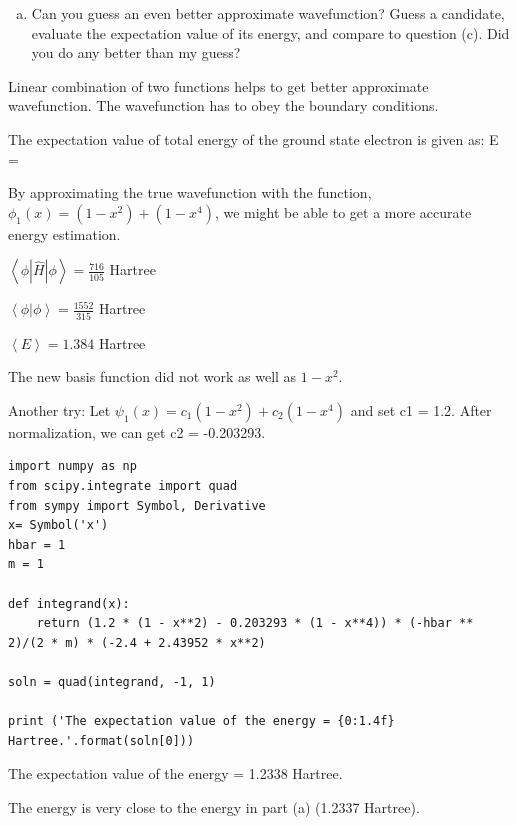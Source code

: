 \documentclass[11pt]{article}
\begin{document}
\begin{enumerate}[(d)]
\item Can you guess an even better approximate wavefunction? Guess a candidate, evaluate the expectation value of its energy, and compare to question (c). Did you do any better than my guess?
\end{enumerate}

Linear combination of two functions helps to get better approximate wavefunction. The wavefunction has to obey the boundary conditions.

\begin{center}

The expectation value of total energy of the ground state electron is given as:
\left \langle E \right \rangle = 

By approximating the true wavefunction with the function, $\phi_{1}(x) = (1 - x^{2}) + (1 - x^{4})$, we might be able to get a more accurate energy estimation. 

${\left \langle \phi | \hat{H} | \phi \right \rangle} = \frac{716}{105}$ Hartree

${\left \langle \phi | \phi \right \rangle} = \frac{1552}{315}$ Hartree

$\left \langle E \right \rangle =  1.384$ Hartree

The new basis function did not work as well as $1 - x^{2}$. 

\end{center}

Another try: Let \(\psi_{1}(x) = c_{1}(1-x^{2}) + c_{2}(1-x^{4})\) and set c1 = 1.2.
After normalization, we can get c2 = -0.203293.
\begin{verbatim}
import numpy as np
from scipy.integrate import quad
from sympy import Symbol, Derivative
x= Symbol('x')
hbar = 1
m = 1

def integrand(x):
    return (1.2 * (1 - x**2) - 0.203293 * (1 - x**4)) * (-hbar ** 2)/(2 * m) * (-2.4 + 2.43952 * x**2) 

soln = quad(integrand, -1, 1)

print ('The expectation value of the energy = {0:1.4f} Hartree.'.format(soln[0]))
\end{verbatim}

The expectation value of the energy = 1.2338 Hartree.

The energy is very close to the energy in part (a) (1.2337 Hartree).
\end{document}
